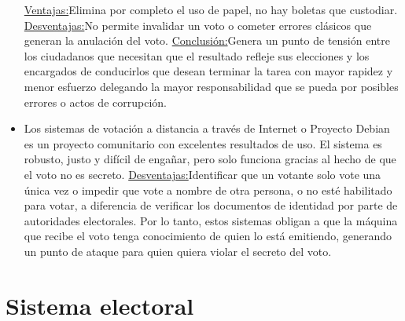 \begin{itemize}
    \underline{Ventajas:}Elimina por completo el uso de papel, no hay boletas que custodiar.\newline
    \underline{Desventajas:}No permite invalidar un voto o cometer errores clásicos que generan la anulación del voto.\newline
    \underline{Conclusión:}Genera un punto de tensión entre los ciudadanos que necesitan que el resultado refleje sus elecciones y los encargados de conducirlos que desean terminar la tarea con mayor rapidez y menor esfuerzo delegando la mayor responsabilidad que se pueda por posibles errores o actos de corrupción.
    \item Los sistemas de votación a distancia a través de Internet o Proyecto Debian es un proyecto comunitario con excelentes resultados de uso. El sistema es robusto, justo y difícil de engañar, pero solo funciona gracias al hecho de que el voto no es secreto.\newline
    \underline{Desventajas:}Identificar que un votante solo vote una única vez o impedir que vote a nombre de otra persona, o no esté habilitado para votar, a diferencia de verificar los documentos de identidad por parte de autoridades electorales. Por lo tanto, estos sistemas obligan a que la máquina que recibe el voto tenga conocimiento de quien lo está emitiendo, generando un punto de ataque para quien quiera violar el secreto del voto.
\end{itemize}

\section{Sistema electoral}

